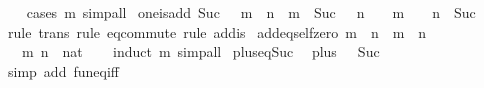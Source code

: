 \begin{isabellebody}
%
\isadelimproof
\ \ %
\endisadelimproof
%
\isatagproof
{}\isamarkupfalse%
\ {\isacharparenleft}{\kern0pt}cases\ m{\isacharparenright}{\kern0pt}\ simp{\isacharunderscore}{\kern0pt}all%
\endisatagproof
{\isafoldproof}%
%
\isadelimproof
\isanewline
%
\endisadelimproof
\isanewline
{}\isamarkupfalse%
\ one{\isacharunderscore}{\kern0pt}is{\isacharunderscore}{\kern0pt}add{\isacharcolon}{\kern0pt}\ {\isachardoublequoteopen}Suc\ {}\ {\isacharequal}{\kern0pt}\ m\ {\isacharplus}{\kern0pt}\ n\ {\isasymlongleftrightarrow}\ m\ {\isacharequal}{\kern0pt}\ Suc\ {}\ {\isasymand}\ n\ {\isacharequal}{\kern0pt}\ {}\ {\isasymor}\ m\ {\isacharequal}{\kern0pt}\ {}\ {\isasymand}\ n\ {\isacharequal}{\kern0pt}\ Suc\ {}{\isachardoublequoteclose}\isanewline
%
\isadelimproof
\ \ %
\endisadelimproof
%
\isatagproof
{}\isamarkupfalse%
\ {\isacharparenleft}{\kern0pt}rule\ trans{\isacharcomma}{\kern0pt}\ rule\ eq{\isacharunderscore}{\kern0pt}commute{\isacharcomma}{\kern0pt}\ rule\ add{\isacharunderscore}{\kern0pt}is{\isacharunderscore}{\kern0pt}{}{\isacharparenright}{\kern0pt}%
\endisatagproof
{\isafoldproof}%
%
\isadelimproof
\isanewline
%
\endisadelimproof
\isanewline
{}\isamarkupfalse%
\ add{\isacharunderscore}{\kern0pt}eq{\isacharunderscore}{\kern0pt}self{\isacharunderscore}{\kern0pt}zero{\isacharcolon}{\kern0pt}\ {\isachardoublequoteopen}m\ {\isacharplus}{\kern0pt}\ n\ {\isacharequal}{\kern0pt}\ m\ {\isasymLongrightarrow}\ n\ {\isacharequal}{\kern0pt}\ {}{\isachardoublequoteclose}\isanewline
\ \ \ m\ n\ {\isacharcolon}{\kern0pt}{\isacharcolon}{\kern0pt}\ nat\isanewline
%
\isadelimproof
\ \ %
\endisadelimproof
%
\isatagproof
{}\isamarkupfalse%
\ {\isacharparenleft}{\kern0pt}induct\ m{\isacharparenright}{\kern0pt}\ simp{\isacharunderscore}{\kern0pt}all%
\endisatagproof
{\isafoldproof}%
%
\isadelimproof
\isanewline
%
\endisadelimproof
\isanewline
{}\isamarkupfalse%
\ plus{\isacharunderscore}{\kern0pt}{}{\isacharunderscore}{\kern0pt}eq{\isacharunderscore}{\kern0pt}Suc{\isacharcolon}{\kern0pt}\isanewline
\ \ {\isachardoublequoteopen}plus\ {}\ {\isacharequal}{\kern0pt}\ Suc{\isachardoublequoteclose}\isanewline
%
\isadelimproof
\ \ %
\endisadelimproof
%
\isatagproof
{}\isamarkupfalse%
\ {\isacharparenleft}{\kern0pt}simp\ add{\isacharcolon}{\kern0pt}\ fun{\isacharunderscore}{\kern0pt}eq{\isacharunderscore}{\kern0pt}iff{\isacharparenright}{\kern0pt}%
\endisatagproof
{\isafoldproof}%

\end{isabellebody}
